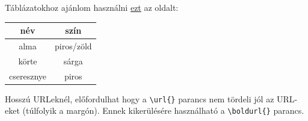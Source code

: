 Táblázatokhoz ajánlom használni \href{https://www.tablesgenerator.com}{ezt} az oldalt:

\begin{table}[H]
  \begin{tabular}{|c|c|}
    \hline
    név        & szín       \\ \hline
    alma       & piros/zöld \\ \hline
    körte      & sárga      \\ \hline
    cseresznye & piros      \\ \hline
  \end{tabular}
\end{table}

Hosszú URLeknél, előfordulhat hogy a \verb=\url{}=\cite{LongUrlExample1} parancs nem tördeli jól az URL-eket (túlfolyik a margón). Ennek kikerülésére használható a \verb=\boldurl{}=\cite{LongUrlExample2} parancs.